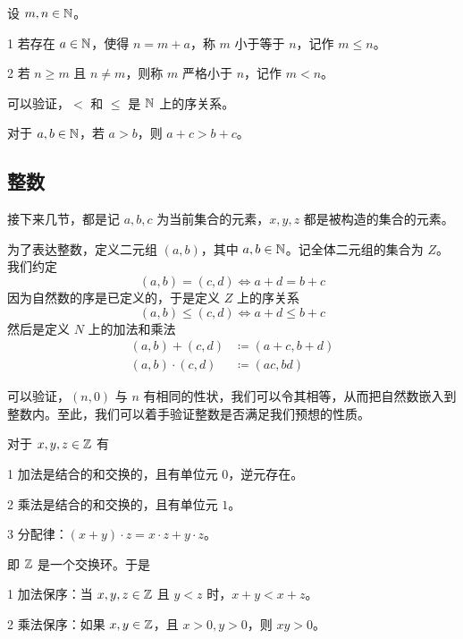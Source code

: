 \begin{definition}[$\NN$ 的序]
	设 $m,n\in \mathbb{N}$。

	\num{1} 若存在 $a\in \mathbb{N}$，使得 $n=m+a$，称 $m$ 小于等于 $n$，记作 $m \leqslant n$。

	\num{2} 若 $n\geqslant m$ 且 $n\ne m$，则称 $m$ 严格小于 $n$，记作 $m < n$。
\end{definition}

可以验证，$<$ 和 $\leqslant$ 是 $\NN$ 上的序关系。

\begin{theorem}[加法保序]
	对于 $a,b\in \mathbb{N}$，若 $a>b$，则 $a+c>b+c$。
\end{theorem}

\subsection{整数}

接下来几节，都是记 $a,b,c$ 为当前集合的元素，$x,y,z$ 都是被构造的集合的元素。

为了表达整数，定义二元组 $(a,b)$，其中 $a,b \in \mathbb{N}$。记全体二元组的集合为 $Z$。我们约定
$$(a,b) = (c,d) \Leftrightarrow a+d=b+c$$
因为自然数的序是已定义的，于是定义 $Z$ 上的序关系
$$(a,b) \leqslant (c,d) \Leftrightarrow a+d \leqslant b+c$$
然后是定义 $N$ 上的加法和乘法
\begin{equation*}
	\begin{aligned}
		(a,b) + (c,d) &\coloneqq  (a+c,b+d)\\
		(a,b) \cdot (c,d) &\coloneqq  (a c,b d)
	\end{aligned}
\end{equation*}

可以验证，$(n,0)$ 与 $n$ 有相同的性状，我们可以令其相等，从而把自然数嵌入到整数内。至此，我们可以着手验证整数是否满足我们预想的性质。

\begin{theorem}[$\ZZ$ 的代数算律]
	对于 $x,y,z\in \mathbb{Z}$ 有

	\num{1} 加法是结合的和交换的，且有单位元 $0$，逆元存在。

	\num{2} 乘法是结合的和交换的，且有单位元 $1$。

	\num{3} 分配律：$(x+y) \cdot  z = x \cdot z + y\cdot z$。
\end{theorem}

即 $\ZZ$ 是一个交换环。于是

\begin{theorem}[$\ZZ$ 是有序域]
	\num{1} 加法保序：当 $x,y,z\in \mathbb{Z}$ 且 $y<z$ 时，$x+y<x+z$。

	\num{2} 乘法保序：如果 $x,y\in \mathbb{Z}$，且 $x>0,y>0$，则 $xy>0$。
\end{theorem}

